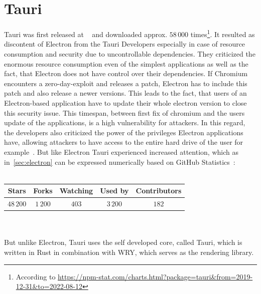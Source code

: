 \section{Tauri}
\label{sec:tauri}
Tauri was first released at ~\cite{tauriRelease} and downloaded approx. $58\,000$ times\footnote{According to \url{https://npm-stat.com/charts.html?package=tauri&from=2019-12-31&to=2022-08-12}}.
It resulted as discontent of Electron from the Tauri Developers especially in case of resource consumption and security due to uncontrollable dependencies.
They criticized the enormous resource consumption even of the simplest applications as well as the fact, that Electron does not have control over their dependencies.
If Chromium encounters a zero-day-exploit and releases a patch, Electron has to include this patch and also release a newer versions.
This leads to the fact, that users of an Electron-based application have to update their whole electron version to close this security issue.
This timespan, between first fix of chromium and the users update of the applications, is a high vulnerability for attackers.
In this regard, the developers also criticized the power of the privileges Electron applications have, allowing attackers to have access to the entire hard drive of the user for example~\cite{tauri}.
But like Electron Tauri experienced increased attention, which as in~\ref{sec:electron} can be expressed numerically based on GitHub Statistics~\cite{GithubTauri}: \\ \\
\begin{tabular} {| c | c | c | c | c |}
    \label{tab:tauri:statistics}
    Stars      & Forks     & Watching & Used by    & Contributors \\ \hline
    $48\,200$ & $1\,200$ & $403$ & $3\,200$ & $182$
\end{tabular} \\ \\
But unlike Electron, Tauri uses the self developed core, called Tauri, which is written in Rust in combination with WRY, which serves as the rendering library.


